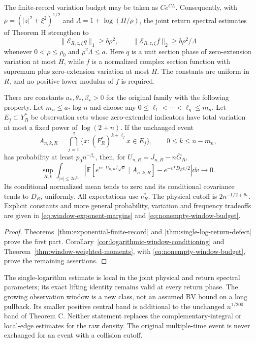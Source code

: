 \begin{maintheorem}
\label{thm:intro-window-reconstruction}
The finite-record variation budget may be taken as $Ce^{CL}$.
Consequently, with $\rho=(|z|^2+\xi^2)^{1/2}$ and
$\Lambda=1+\log(H/\rho)$, the joint return spectral estimates of
Theorem H strengthen to
\[
 \|\mathcal E_{R,z,\xi}q\|_1\ge b\rho^2,\qquad
 \|\mathcal E_{R,z,\xi}f\|_2\ge b\rho^2/\Lambda
\]
whenever $0<\rho\le\rho_0$ and $\rho^2\Lambda\le a$.
Here $q$ is a unit section phase of zero-extension variation at most
$H$, while $f$ is a normalized complex section function with supremum
plus zero-extension variation at most $H$. The constants are uniform
in $R$, and no positive lower modulus of $f$ is required.

There are constants $a_*,\theta_*,\beta_*>0$ for the original family
with the following property. Let $m_n\le a_*\log n$ and choose any
$0\le\ell_1<\cdots<\ell_q\le m_n$. Let $E_j\subset Y_R^*$ be
observation sets whose zero-extended indicators have total variation
at most a fixed power of $\log(2+n)$. If the unchanged event
\[
 A_{n,k,R}=\bigcap_{j=1}^{q}
       \{x:(F_R^*)^{k+\ell_j}x\in E_j\},\qquad
                       0\le k\le n-m_n,
\]
has probability at least $p_0 n^{-\beta_*}$, then, for
$U_{n,R}=J_{n,R}-n\bar G_R$,
\[
 \sup_{R,k}\int_{|v|\le2n^{\theta_*}}
 \left|\mathbb E[e^{iv\cdot U_{n,R}/\sqrt n}\mid A_{n,k,R}]
                          -e^{-v^{\mathsf T}D_Rv/2}\right|\dd v
                           \longrightarrow0.
\]
Its conditional normalized mean tends to zero and its conditional
covariance tends to $D_R$, uniformly. All expectations use $\nu_R^*$.
The physical cutoff is $2n^{-1/2+\theta_*}$. Explicit constants and
more general probability, variation and frequency tradeoffs are given
in \eqref{eq:window-exponent-margins} and
\eqref{eq:nonempty-window-budget}.
\end{maintheorem}
\begin{proof}
Theorems~\ref{thm:exponential-finite-record} and
\ref{thm:single-log-return-defect} prove the first part.
Corollary~\ref{cor:logarithmic-window-conditioning} and
Theorem~\ref{thm:window-weighted-moments}, with
\eqref{eq:nonempty-window-budget}, prove the remaining assertions.
\end{proof}

The single-logarithm estimate is local in the joint physical and return
spectral parameters; its exact lifting identity remains valid at every
return phase. The growing observation window is a new class, not an
assumed BV bound on a long pullback. Its smaller positive central band
is additional to the unchanged $n^{1/200}$ band of Theorem C.
Neither statement replaces the complementary-integral or local-edge
estimates for the raw density. The original multiple-time event is
never exchanged for an event with a collision cutoff.

